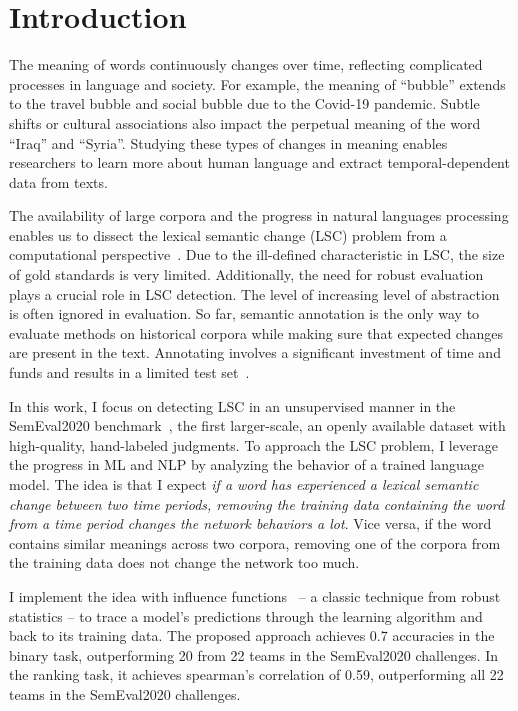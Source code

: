 \section{Introduction}

The meaning of words continuously changes over time, reflecting complicated processes in language and society. 
For example, the meaning of ``bubble'' extends to the travel bubble and social bubble due to the Covid-19 pandemic.
Subtle shifts or cultural associations also impact the perpetual meaning of the word ``Iraq'' and ``Syria''.
Studying these types of changes in meaning enables researchers to learn more about human language and extract temporal-dependent data from texts.

The availability of large corpora and the progress in natural languages processing enables us to dissect the lexical semantic change (LSC) problem from a computational perspective~\cite{diachronic-survey}.
Due to the ill-defined characteristic in LSC, the size of gold standards is very limited.
Additionally, the need for robust evaluation plays a crucial role in LSC detection. 
The level of increasing level of abstraction is often ignored in evaluation. 
So far, semantic annotation is the only way to evaluate methods on historical corpora while making sure that expected changes are present in the text. 
Annotating involves a significant investment of time and funds and results in a limited test set~\cite{challenges_lsc}.


In this work, I focus on detecting LSC in an unsupervised manner in the SemEval2020 benchmark~\cite{semeval2020}, the first larger-scale, an openly available dataset with high-quality, hand-labeled judgments.
To approach the LSC problem, I leverage the progress in ML and NLP by analyzing the behavior of a trained language model.
The idea is that I expect \textit{if a word has experienced a lexical semantic change between two time periods, removing the training data containing the word from a time period changes the network behaviors a lot}.
Vice versa, if the word contains similar meanings across two corpora, removing one of the corpora from the training data does not change the network too much.

I implement the idea with influence functions~\cite{influence_fn} -- a classic technique from robust statistics -- to trace a model's predictions through the learning algorithm and back to its training data.
The proposed approach achieves 0.7 accuracies in the binary task, outperforming 20 from 22 teams in the SemEval2020 challenges.
In the ranking task, it achieves spearman's correlation of 0.59, outperforming all 22 teams in the SemEval2020 challenges.

